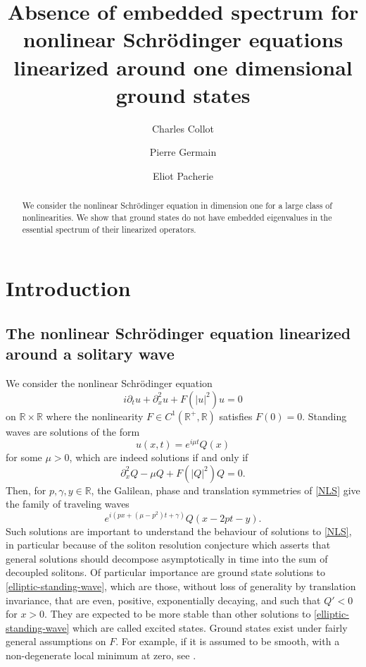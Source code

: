\documentclass[11 pt]{amsart}
\author{Charles Collot}
\author{Pierre Germain}
\author{Eliot Pacherie}
\theoremstyle{definition}
\theoremstyle{remark}
\numberwithin{equation}{section}
\begin{document}
\title[Absence of embedded spectrum for linearized nonlinear Schr\"odinger equations]{Absence of embedded spectrum for nonlinear Schr\"odinger equations linearized around one dimensional ground
states}

\maketitle

\begin{abstract}
    We consider the nonlinear Schrödinger equation in dimension one for a large class of nonlinearities. We show that ground states do not have embedded eigenvalues in the essential spectrum of their linearized operators.
\end{abstract}

\section{Introduction}

\subsection{The nonlinear Schr\"odinger equation linearized around a solitary wave}

We consider the nonlinear Schr{\"o}dinger equation
\begin{equation}
\label{NLS}
\tag{NLS}
i \partial_t u + \partial_x^2 u + F (| u |^2) u = 0 
\end{equation}
on $\mathbb{R} \times \mathbb{R}$ where the nonlinearity $F \in C^1
(\mathbb{R}^+, \mathbb{R})$ satisfies $F (0) = 0$. Standing waves are solutions of the form
\[ u (x, t) = e^{i \mu t} Q (x) \]
for some $\mu > 0$, which are indeed solutions if and only if
\begin{equation}\label{elliptic-standing-wave} \partial_x^2 Q - \mu Q + F (| Q |^2) Q = 0. 
\end{equation}
Then, for $p, \gamma, y \in \mathbb{R}$, the Galilean, phase and translation symmetries of \eqref{NLS} give the family of traveling waves
$$
e^{i( p x +( \mu-p^2) t + \gamma)} Q (x-2p t - y).
$$
Such solutions are important to understand the behaviour of solutions to \eqref{NLS}, in particular because of the soliton resolution conjecture which asserts that general solutions should decompose asymptotically in time into the sum of decoupled solitons. Of particular importance are ground state solutions to \eqref{elliptic-standing-wave}, which are those, without loss of generality by translation invariance, that are even, positive, exponentially decaying, and such that $Q'<0$ for $x>0$. They are expected to be more stable than other solutions to \eqref{elliptic-standing-wave} which are called excited states. Ground states exist under fairly general assumptions on $F$. For example, if it is assumed to be smooth, with a non-degenerate local minimum at zero, see \cite{BL}.
\end{document}
